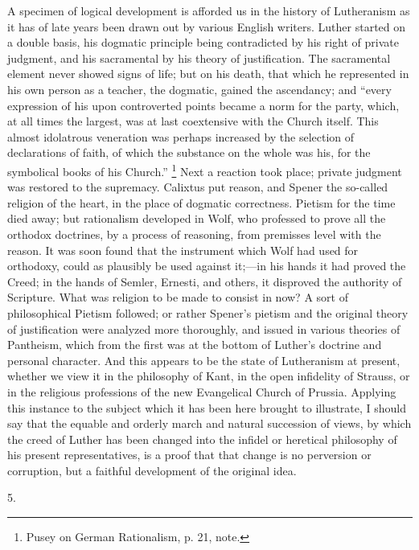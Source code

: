 A specimen of logical development is afforded us in
the history of Lutheranism as it has of late years been
drawn out by various English writers. Luther started on a
double basis, his dogmatic principle being contradicted
by his right of private judgment, and his sacramental by
his theory of justification. The sacramental element
never showed signs of life; but on his death, that which
he represented in his own person as a teacher, the
dogmatic, gained the ascendancy; and ``every
expression of his upon controverted points became a norm
for the party, which, at all times the largest, was at
last coextensive with the Church itself. This almost
idolatrous veneration was perhaps increased by the
selection of declarations of faith, of which the
substance on the whole was his, for the symbolical books
of his Church.'' \footnote{Pusey on German Rationalism, p.
21, note.} Next a reaction took place;
private judgment was restored to the supremacy. Calixtus
put reason, and Spener the so-called religion of the
heart, in the place of dogmatic correctness. Pietism for
the time died away; but rationalism developed in Wolf,
who professed to prove all the orthodox doctrines, by a
process of reasoning, from premisses level with the
reason. It was soon found that the instrument which Wolf
had used for orthodoxy, could as plausibly be used
against it;—in his hands it had proved the Creed; in
the hands of Semler, Ernesti, and others, it disproved
the authority of Scripture. What was religion to be made
to consist in now? A sort of philosophical Pietism
followed; or rather Spener's pietism and the original
theory of justification were analyzed more thoroughly,
and issued in various theories of Pantheism, which from
the first was at the bottom of Luther's doctrine and
personal character. And this appears to be the state of
Lutheranism at present, whether we view it in the
philosophy of Kant, in the open infidelity of Strauss, or
in the religious professions of the new Evangelical
Church of Prussia. Applying this instance to the subject
which it has been here brought to illustrate, I should
say that the equable and orderly march and natural
succession of views, by which the creed of Luther has
been changed into the infidel or heretical philosophy of
his present representatives, is a proof that that change
is no perversion or corruption, but a faithful
development of the original idea.

5.

